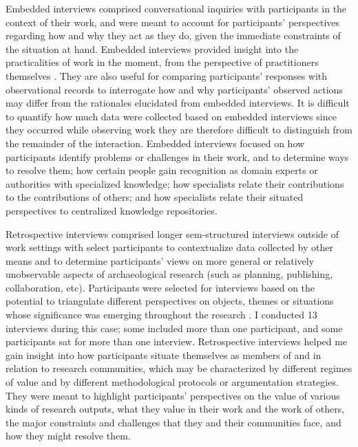 \documentclass[
]{article}
\begin{document}
Embedded interviews comprised conversational inquiries with participants
in the context of their work, and were meant to account for
participants' perspectives regarding how and why they act as they do,
given the immediate constraints of the situation at hand. Embedded
interviews provided insight into the practicalities of work in the
moment, from the perspective of practitioners themselves
\autocite{flick1997,flick2000,witzel2000}. They are also useful for
comparing participants' responses with observational records to
interrogate how and why participants' observed actions may differ from
the rationales elucidated from embedded interviews. It is difficult to
quantify how much data were collected based on embedded interviews since
they occurred while observing work they are therefore difficult to
distinguish from the remainder of the interaction. Embedded interviews
focused on how participants identify problems or challenges in their
work, and to determine ways to resolve them; how certain people gain
recognition as domain experts or authorities with specialized knowledge;
how specialists relate their contributions to the contributions of
others; and how specialists relate their situated perspectives to
centralized knowledge repositories.

Retrospective interviews comprised longer sem-structured interviews
outside of work settings with select participants to contextualize data
collected by other means and to determine participants' views on more
general or relatively unobservable aspects of archaeological research
(such as planning, publishing, collaboration, etc). Participants were
selected for interviews based on the potential to triangulate different
perspectives on objects, themes or situations whose significance was
emerging throughout the research \autocite{morse2019}. I conducted 13
interviews during this case; some included more than one participant,
and some participants sat for more than one interview. Retrospective
interviews helped me gain insight into how participants situate
themselves as members of and in relation to research communities, which
may be characterized by different regimes of value and by different
methodological protocols or argumentation strategies. They were meant to
highlight participants' perspectives on the value of various kinds of
research outputs, what they value in their work and the work of others,
the major constraints and challenges that they and their communities
face, and how they might resolve them.
\end{document}
